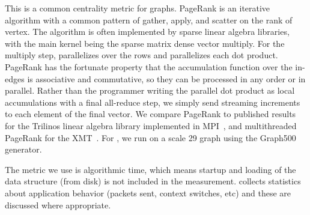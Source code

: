 \vspace{0.5ex}
 This is a common centrality metric for
graphs. PageRank is an iterative algorithm with a common
pattern of gather, apply, and scatter on the rank of vertex. The algorithm
is often implemented by sparse linear algebra libraries, with the main
kernel being the sparse matrix dense vector multiply. For the multiply
step, \Grappa parallelizes over the rows and parallelizes each dot
product. PageRank has the fortunate property that the accumulation
function over the in-edges is associative and commutative, so they can
be processed in any order or in parallel. Rather than the programmer writing the
parallel dot product as local accumulations with a final all-reduce
step, we simply send streaming increments to each element of the final
vector. We compare PageRank to published results for the Trilinos linear algebra library implemented in MPI~\cite{Plimpton:2011:MML:2286659.2286704},
 and multithreaded PageRank for the XMT~\cite{MTGL:pagerank}.
For \Grappa, we run on a scale 29 graph using the Graph500 generator.

The metric we use is algorithmic time, which means startup and loading of the
data structure (from disk) is not included in the measurement. \Grappa
collects statistics about application behavior (packets sent, context
switches, etc) and these are discussed where appropriate. 

